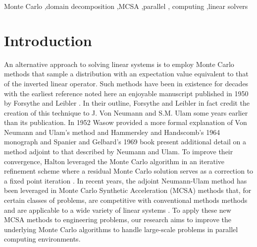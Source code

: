 \documentclass[preprint,11pt]{elsarticle}
\begin{document}
\begin{frontmatter}
  \begin{keyword}
    Monte Carlo \sep domain decomposition \sep MCSA \sep parallel \sep
    computing \sep linear solvers
  \end{keyword}

\end{frontmatter}

\section{Introduction}
\label{sec:intro}

An alternative approach to solving linear systems is to employ Monte Carlo
methods that sample a distribution with an expectation value equivalent to
that of the inverted linear operator. Such methods have been in existence for
decades with the earliest reference noted here an enjoyable manuscript
published in 1950 by Forsythe and Leibler \cite{forsythe_matrix_1950}. In
their outline, Forsythe and Leibler in fact credit the creation of this
technique to J. Von Neumann and S.M. Ulam some years earlier than its
publication. In 1952 Wasow provided a more formal explanation of Von Neumann
and Ulam's method \cite{wasow_note_1952} and Hammersley and Handscomb's 1964
monograph \cite{hammersley_monte_1964} and Spanier and Gelbard's 1969 book
\cite{spanier_monte_1969} present additional detail on a method adjoint to
that described by Neumann and Ulam. To improve their convergence, Halton
leveraged the Monte Carlo algorithm in an iterative refinement scheme where a
residual Monte Carlo solution serves as a correction to a fixed point
iteration \cite{halton_sequential_1962}. In recent years, the adjoint
Neumann-Ulam method has been leveraged in Monte Carlo Synthetic Acceleration
(MCSA) methods that, for certain classes of problems, are competitive with
conventional methods methods and are applicable to a wide variety of linear
systems \cite{evans_monte_2009,evans_monte_2014}. To apply these new MCSA
methods to engineering problems, our research aims to improve the underlying
Monte Carlo algorithms to handle large-scale problems in parallel computing
environments.
\end{document}
